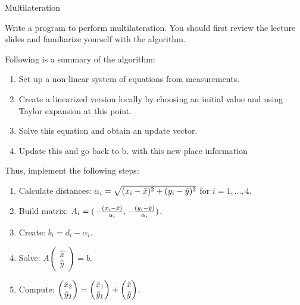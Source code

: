 \documentclass[twoside]{article}
\begin{document}
\begin{task}{Multilateration}{}{}

Write a program to perform multilateration.
You should first review the lecture slides and familiarize yourself with the algorithm.
\vspace{10pt}

\noindent Following is a summary of the algorithm:
\begin{enumerate}
    \item Set up a non-linear system of equations from measurements.
    \item Create a linearized version locally by choosing an initial value and using Taylor expansion at this point.
    \item Solve this equation and obtain an update vector.
    \item Update this and go back to b. with this new place information
\end{enumerate}
\vspace{5pt}
Thus, implement the following steps:
\begin{enumerate}
    \item Calculate distances:
$\alpha_{i}=\sqrt{(x_{i}-\Tilde{x})^2+(y_{i}-\Tilde{y})^2}$ for $i = 1, ..., 4$.
    \item Build matrix:
$A_{i}=(-\frac{(x_{i}-\Tilde{x})}{\alpha_{i}}, -\frac{(y_{i}-\Tilde{y})}{\alpha_{i}})$.
    \item Create: $b_{i}=d_{i}-\alpha_{i}$.
    \item Solve: $A\begin{pmatrix}\hat{x}\\\hat{y}\end{pmatrix}=b$.
    \item Compute: $\begin{pmatrix}\Tilde{x}_{2}\\\Tilde{y}_{2}\end{pmatrix}= \begin{pmatrix}\Tilde{x}_{1}\\\Tilde{y}_{1}\end{pmatrix} + \begin{pmatrix}\hat{x}\\\hat{y}\end{pmatrix}$.
\end{enumerate}


\end{task}
\end{document}
